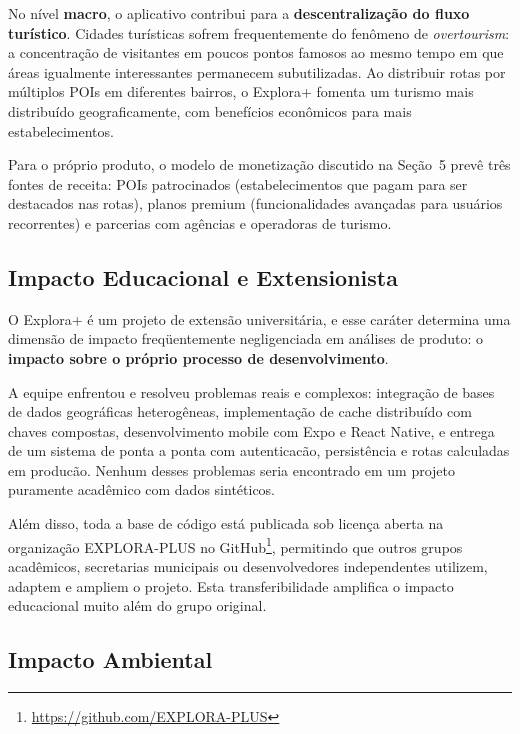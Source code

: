 \documentclass[12pt, a4paper]{article}
\begin{document}
No n\'ivel \textbf{macro}, o aplicativo contribui para a \textbf{descentraliza\c{c}\~ao do fluxo tur\'istico}. Cidades tur\'isticas sofrem frequentemente do fen\^omeno de \textit{overtourism}: a concentra\c{c}\~ao de visitantes em poucos pontos famosos ao mesmo tempo em que \'areas igualmente interessantes permanecem subutilizadas. Ao distribuir rotas por m\'ultiplos POIs em diferentes bairros, o Explora+ fomenta um turismo mais distribu\'ido geograficamente, com benef\'icios econ\^omicos para mais estabelecimentos.

Para o pr\'oprio produto, o modelo de monetiza\c{c}\~ao discutido na Se\c{c}\~ao~5 prev\^e tr\^es fontes de receita: POIs patrocinados (estabelecimentos que pagam para ser destacados nas rotas), planos premium (funcionalidades avan\c{c}adas para usu\'arios recorrentes) e parcerias com ag\^encias e operadoras de turismo.

\subsection{Impacto Educacional e Extensionista}

O Explora+ \'e um projeto de extens\~ao universit\'aria, e esse car\'ater determina uma dimens\~ao de impacto freq\"uentemente negligenciada em an\'alises de produto: o \textbf{impacto sobre o pr\'oprio processo de desenvolvimento}.

A equipe enfrentou e resolveu problemas reais e complexos: integra\c{c}\~ao de bases de dados geogr\'aficas heterog\^eneas, implementa\c{c}\~ao de cache distribu\'ido com chaves compostas, desenvolvimento mobile com Expo e React Native, e entrega de um sistema de ponta a ponta com autenticac\~ao, persist\^encia e rotas calculadas em produc\~ao. Nenhum desses problemas seria encontrado em um projeto puramente acad\^emico com dados sint\'eticos.

Al\'em disso, toda a base de c\'odigo est\'a publicada sob licen\c{c}a aberta na organiza\c{c}\~ao EXPLORA-PLUS no GitHub\footnote{\url{https://github.com/EXPLORA-PLUS}}, permitindo que outros grupos acad\^emicos, secretarias municipais ou desenvolvedores independentes utilizem, adaptem e ampliem o projeto. Esta transferibilidade amplifica o impacto educacional muito al\'em do grupo original.

\subsection{Impacto Ambiental}
\end{document}
